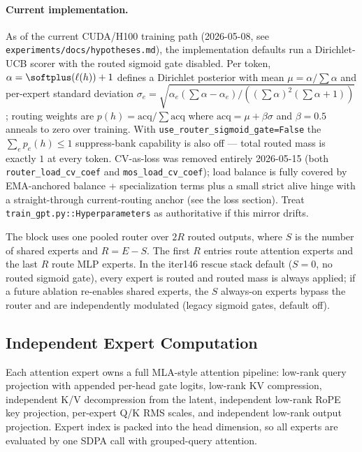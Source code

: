 \documentclass[11pt]{article}
\begin{document}
\paragraph{Current implementation.} As of the current CUDA/H100 training path
(2026-05-08, see
\texttt{experiments/docs/hypotheses.md}), the implementation defaults run a
Dirichlet-UCB scorer with the routed sigmoid gate disabled.  Per token,
$\alpha = \softplus(\ell(h)) + 1$ defines a Dirichlet posterior with mean
$\mu = \alpha / \sum \alpha$ and per-expert standard deviation
$\sigma_e = \sqrt{\alpha_e(\sum\alpha - \alpha_e) / ((\sum\alpha)^2(\sum\alpha+1))}$;
routing weights are $p(h) = \mathrm{acq} / \sum \mathrm{acq}$ where
$\mathrm{acq} = \mu + \beta \sigma$ and $\beta=0.5$ anneals to zero over
training.  With \texttt{use\_router\_sigmoid\_gate=False} the
$\sum_e p_e(h)\le 1$ suppress-bank capability is also off — total routed mass
is exactly $1$ at every token.  CV-as-loss was removed entirely 2026-05-15
(both \texttt{router\_load\_cv\_coef} and \texttt{mos\_load\_cv\_coef}); load
balance is fully covered by EMA-anchored balance + specialization terms plus
a small strict alive hinge with a straight-through current-routing anchor
(see the loss section).  Treat \texttt{train\_gpt.py::Hyperparameters} as
authoritative if this mirror drifts.

The block uses one pooled router over $2R$ routed outputs, where $S$ is the
number of shared experts and $R=E-S$.  The first $R$ entries route attention
experts and the last $R$ route MLP experts.  In the iter146 rescue stack
default ($S=0$, no routed sigmoid gate), every expert is routed and routed
mass is always applied; if a future ablation re-enables shared experts,
the $S$ always-on experts bypass the router and are independently modulated
(legacy sigmoid gates, default off).

\subsection{Independent Expert Computation}
\label{sec:experts}

Each attention expert owns a full MLA-style attention pipeline:
low-rank query projection with appended per-head gate logits, low-rank
KV compression, independent K/V decompression from the latent, independent
low-rank RoPE key projection, per-expert Q/K RMS scales, and independent
low-rank output projection.  Expert index is packed into the head dimension,
so all experts are evaluated by one SDPA call with grouped-query attention.
\end{document}
